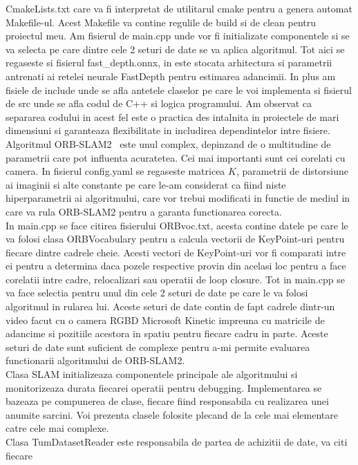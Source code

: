 \documentclass[12pt,a4paper]{report}
\begin{document}
CmakeLists.txt care va fi interpretat de utilitarul cmake pentru a genera automat Makefile-ul. 
Acest Makefile va contine regulile de build si de clean pentru proiectul meu. Am fisierul de 
main.cpp unde vor fi initializate componentele si se va selecta pe care dintre cele 2 seturi
de date se va aplica algoritmul. Tot aici se regaseste si fisierul fast\_depth.onnx, in este 
stocata arhitectura si parametrii antrenati ai retelei neurale FastDepth pentru estimarea 
adancimii. In plus am fisiele de include unde se afla antetele claselor pe care le voi 
implementa si fisierul de src unde se afla codul de C++ si logica programului. Am observat ca 
separarea codului in acest fel este o practica des intalnita in proiectele de mari dimensiuni 
si garanteaza flexibilitate in includirea dependintelor intre fisiere. Algoritmul ORB-SLAM2 \
este unul complex, depinzand de o multitudine de parametrii care pot influenta acuratetea.
Cei mai importanti sunt cei corelati cu camera. In fisierul config.yaml se regaseste matricea \(K\), 
parametrii de distorsiune ai imaginii si alte constante pe care le-am considerat ca fiind niste
hiperparametrii ai algoritmului, care vor trebui modificati in functie de mediul in care va rula
ORB-SLAM2 pentru a garanta functionarea corecta. \\
In main.cpp se face citirea fisierului ORBvoc.txt, acesta contine datele pe care le va folosi
clasa ORBVocabulary pentru a calcula vectorii de KeyPoint-uri pentru fiecare dintre cadrele cheie.
Acesti vectori de KeyPoint-uri vor fi comparati intre ei pentru a determina daca pozele respective 
provin din acelasi loc pentru a face corelatii intre cadre, relocalizari sau operatii de loop
closure. Tot in main.cpp se va face selectia pentru unul din cele 2 seturi de date pe care le va
folosi algoritmul in rularea lui. Aceste seturi de date contin de fapt cadrele dintr-un video 
facut cu o camera RGBD Microsoft Kinetic impreuna cu matricile de adancime si pozitiile acestora
in spatiu pentru fiecare cadru in parte. Aceste seturi de date sunt suficient de complexe pentru 
a-mi permite evaluarea functionarii algoritmului de ORB-SLAM2. \\
Clasa SLAM initializeaza componentele principale ale algoritmului si monitorizeaza durata 
fiecarei operatii pentru debugging. Implementarea se bazeaza pe compunerea de clase, fiecare 
fiind responsabila cu realizarea unei anumite sarcini. Voi prezenta clasele folosite plecand 
de la cele mai elementare catre cele mai complexe. \\       
Clasa TumDatasetReader este responsabila de partea de achizitii de date, va citi fiecare 
\end{document}
